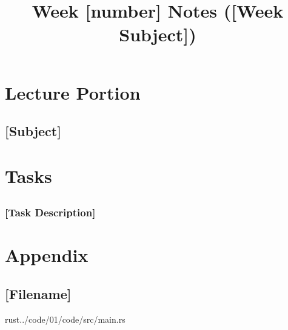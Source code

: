 \documentclass{article}
\title{Week [number] Notes ([Week Subject])}
\begin{document}
\maketitle

\section{Lecture Portion}

\subsection{[Subject]}

\section{Tasks}

\subsection{}

\subsubsection{[Task Description]}

\pagebreak
{}


\section*{Appendix}

\subsection*{[Filename]}
\begin{inputminted}{rust}{../code/01/code/src/main.rs}
\end{inputminted}
\end{document}

